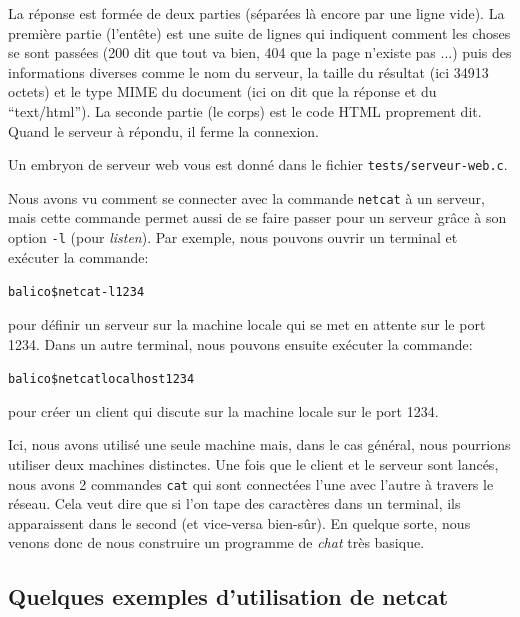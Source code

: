 \documentclass[10pt,a4paper]{article}
\begin{document}
La réponse est formée de deux parties (séparées là encore par une
ligne vide). La première partie (l'entête) est une suite de lignes
qui indiquent comment les choses se sont passées (200 dit que tout va
bien, 404 que la page n'existe pas ...) puis des informations diverses comme
le nom du serveur, la taille du résultat (ici 34913 octets) et le type
MIME du document (ici on dit que la réponse et du ``text/html''). La
seconde partie (le corps) est le code HTML proprement dit. Quand le
serveur à répondu, il ferme la connexion.

\smallskip
Un embryon de serveur web vous est donné dans le fichier \texttt{tests/serveur-web.c}.

\smallskip
Nous avons vu comment se connecter avec la commande \texttt{netcat} à
un serveur, mais cette commande permet aussi de se faire passer pour
un serveur grâce à son option \texttt{-l} (pour \emph{listen}). Par
exemple, nous pouvons ouvrir un terminal et exécuter la commande:
\begin{alltt}
    balico\$ netcat -l 1234
\end{alltt}
pour définir un serveur sur la machine locale qui se met en attente
sur le port 1234.
Dans un autre terminal, nous pouvons ensuite exécuter la commande:
\begin{alltt}
    balico\$ netcat localhost 1234
\end{alltt}
pour créer un client qui discute sur la machine locale sur le port
1234.

\medskip
Ici, nous avons utilisé une seule machine mais, dans le cas
général, nous pourrions utiliser deux machines distinctes.  Une fois
que le client et le serveur sont lancés, nous avons 2 commandes
\texttt{cat} qui sont connectées l'une avec l'autre à travers le
réseau. Cela veut dire que si l'on tape des caractères dans un
terminal, ils apparaissent dans le second (et vice-versa bien-sûr).
En quelque sorte, nous venons donc de nous construire un programme de
\emph{chat} très basique.

\subsection*{Quelques exemples d'utilisation de netcat}
\end{document}
